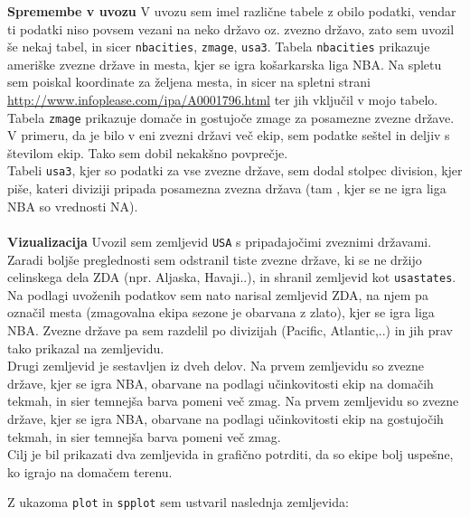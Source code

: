 \documentclass[11pt,a4paper]{article}
\begin{document}
\textbf{Spremembe v uvozu}
V uvozu sem imel različne tabele z obilo podatki, vendar ti podatki niso povsem vezani na neko državo oz. zvezno državo, zato sem uvozil še nekaj tabel, in sicer \verb|nbacities|, \verb|zmage|, \verb|usa3|. Tabela \verb|nbacities| prikazuje ameriške zvezne države in mesta, kjer se igra košarkarska liga NBA. Na spletu sem poiskal koordinate za željena mesta, in sicer na spletni strani \url{http://www.infoplease.com/ipa/A0001796.html} ter jih vključil v mojo tabelo.\\

Tabela \verb|zmage| prikazuje domače in gostujoče zmage za posamezne zvezne države. V primeru, da je bilo v eni zvezni državi več ekip, sem podatke seštel in deljiv s številom ekip. Tako sem dobil nekakšno povprečje.\\

Tabeli \verb|usa3|, kjer so podatki za vse zvezne države, sem dodal stolpec division, kjer piše, kateri diviziji pripada posamezna zvezna država (tam , kjer se ne igra liga NBA so vrednosti NA).\\
\\
\textbf{Vizualizacija}
\newline
Uvozil sem zemljevid \verb|USA| s pripadajočimi zveznimi državami. Zaradi boljše preglednosti sem odstranil tiste zvezne države, ki se ne držijo celinskega dela ZDA (npr. Aljaska, Havaji..), in shranil zemljevid kot \verb|usastates|. Na podlagi uvoženih podatkov sem nato narisal zemljevid ZDA, na njem pa označil mesta (zmagovalna ekipa sezone je obarvana z zlato), kjer se igra liga NBA. Zvezne države pa sem razdelil po divizijah (Pacific, Atlantic,..) in jih prav tako prikazal na zemljevidu.\\


Drugi zemljevid je sestavljen iz dveh delov. 
Na prvem zemljevidu so zvezne države, kjer se igra NBA, obarvane na podlagi učinkovitosti ekip na domačih tekmah, in sier temnejša barva pomeni več zmag.
Na prvem zemljevidu so zvezne države, kjer se igra NBA, obarvane na podlagi učinkovitosti ekip na gostujočih tekmah, in sier temnejša barva pomeni več zmag.\\
Cilj je bil prikazati dva zemljevida in grafično potrditi, da so ekipe bolj uspešne, ko igrajo na domačem terenu.

Z ukazoma \verb|plot| in \verb|spplot| sem ustvaril naslednja zemljevida:



\end{document}
